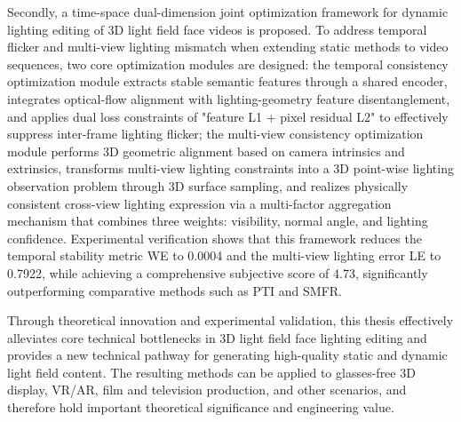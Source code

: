 \begin{enabstract}
Secondly, a time-space dual-dimension joint optimization framework for dynamic lighting editing of 3D light field face videos is proposed. To address temporal flicker and multi-view lighting mismatch when extending static methods to video sequences, two core optimization modules are designed: the temporal consistency optimization module extracts stable semantic features through a shared encoder, integrates optical-flow alignment with lighting-geometry feature disentanglement, and applies dual loss constraints of "feature L1 + pixel residual L2" to effectively suppress inter-frame lighting flicker; the multi-view consistency optimization module performs 3D geometric alignment based on camera intrinsics and extrinsics, transforms multi-view lighting constraints into a 3D point-wise lighting observation problem through 3D surface sampling, and realizes physically consistent cross-view lighting expression via a multi-factor aggregation mechanism that combines three weights: visibility, normal angle, and lighting confidence. Experimental verification shows that this framework reduces the temporal stability metric WE to 0.0004 and the multi-view lighting error LE to 0.7922, while achieving a comprehensive subjective score of 4.73, significantly outperforming comparative methods such as PTI and SMFR.

Through theoretical innovation and experimental validation, this thesis effectively alleviates core technical bottlenecks in 3D light field face lighting editing and provides a new technical pathway for generating high-quality static and dynamic light field content. The resulting methods can be applied to glasses-free 3D display, VR/AR, film and television production, and other scenarios, and therefore hold important theoretical significance and engineering value.

\end{enabstract}
